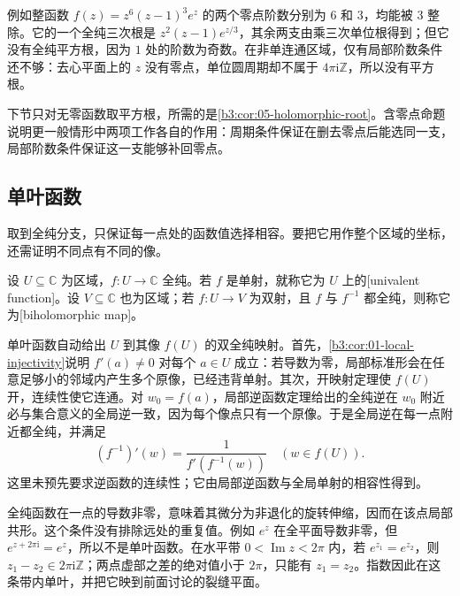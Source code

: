 例如整函数 \(f(z)=z^6(z-1)^3e^z\) 的两个零点阶数分别为 \(6\) 和 \(3\)，均能被 \(3\) 整除。它的一个全纯三次根是 \(z^2(z-1)e^{z/3}\)，其余两支由乘三次单位根得到；但它没有全纯平方根，因为 \(1\) 处的阶数为奇数。在非单连通区域，仅有局部阶数条件还不够：去心平面上的 \(z\) 没有零点，单位圆周期却不属于 \(4\pi\mathrm{i}\mathbb Z\)，所以没有平方根。

\ProseParagraphBreak

下节只对无零函数取平方根，所需的是\cref{b3:cor:05-holomorphic-root}。含零点命题说明更一般情形中两项工作各自的作用：周期条件保证在删去零点后能选同一支，局部阶数条件保证这一支能够补回零点。

\subsection{单叶函数}
\label{b3:subsec:050104}

取到全纯分支，只保证每一点处的函数值选择相容。要把它用作整个区域的坐标，还需证明不同点有不同的像。

\begin{definition}\label{b3:def:05-univalent}
设 \(U\subseteq\mathbb C\) 为区域，\(f:U\to\mathbb C\) 全纯。若 \(f\) 是单射，就称它为 \(U\) 上的[univalent function]。设 \(V\subseteq\mathbb C\) 也为区域；若 \(f:U\to V\) 为双射，且 \(f\) 与 \(f^{-1}\) 都全纯，则称它为[biholomorphic map]。
\end{definition}

单叶函数自动给出 \(U\) 到其像 \(f(U)\) 的双全纯映射。首先，\cref{b3:cor:01-local-injectivity}说明 \(f'(a)\ne0\) 对每个 \(a\in U\) 成立：若导数为零，局部标准形会在任意足够小的邻域内产生多个原像，已经违背单射。其次，开映射定理使 \(f(U)\) 开，连续性使它连通。对 \(w_0=f(a)\)，局部逆函数定理给出的全纯逆在 \(w_0\) 附近必与集合意义的全局逆一致，因为每个像点只有一个原像。于是全局逆在每一点附近都全纯，并满足
\[
 (f^{-1})'(w)=\frac1{f'(f^{-1}(w))}\quad(w\in f(U)).
\]
这里未预先要求逆函数的连续性；它由局部逆函数与全局单射的相容性得到。

\ProseParagraphBreak

全纯函数在一点的导数非零，意味着其微分为非退化的旋转伸缩，因而在该点局部共形。这个条件没有排除远处的重复值。例如 \(e^z\) 在全平面导数非零，但 \(e^{z+2\pi\mathrm{i}}=e^z\)，所以不是单叶函数。在水平带 \(0<\operatorname{Im}z<2\pi\) 内，若 \(e^{z_1}=e^{z_2}\)，则 \(z_1-z_2\in2\pi\mathrm{i}\mathbb Z\)；两点虚部之差的绝对值小于 \(2\pi\)，只能有 \(z_1=z_2\)。指数因此在这条带内单叶，并把它映到前面讨论的裂缝平面。

